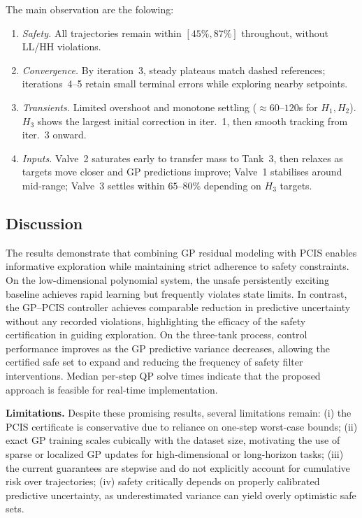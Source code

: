 \documentclass[10pt]{article}
\newcommand{\1}{\mathbbm{1}}
\begin{document}
The main observation are the folowing:
\begin{enumerate}
    \item \textit{Safety.} All trajectories remain within $[45\%,87\%]$ throughout, without LL/HH violations.
    \item \textit{Convergence.} By iteration~3, steady plateaus match dashed references; iterations~4–5 retain small terminal errors while exploring nearby setpoints.
    \item \textit{Transients.} Limited overshoot and monotone settling ($\approx60$–$120$s for $H_1,H_2$). $H_3$ shows the largest initial correction in iter.~1, then smooth tracking from iter.~3 onward.
    \item \textit{Inputs.} Valve~2 saturates early to transfer mass to Tank~3, then relaxes as targets move closer and GP predictions improve; Valve~1 stabilises around mid-range; Valve~3 settles within $65$–$80\%$ depending on $H_3$ targets.
\end{enumerate}

\subsection{Discussion}
\label{sec:discussion}
The results demonstrate that combining GP residual modeling with PCIS enables informative exploration while maintaining strict adherence to safety constraints. On the low-dimensional polynomial system, the unsafe persistently exciting baseline achieves rapid learning but frequently violates state limits. In contrast, the GP--PCIS controller achieves comparable reduction in predictive uncertainty without any recorded violations, highlighting the efficacy of the safety certification in guiding exploration. On the three-tank process, control performance improves as the GP predictive variance decreases, allowing the certified safe set to expand and reducing the frequency of safety filter interventions. Median per-step QP solve times indicate that the proposed approach is feasible for real-time implementation.

\textbf{Limitations.} Despite these promising results, several limitations remain:  
(i) the PCIS certificate is conservative due to reliance on one-step worst-case bounds;  
(ii) exact GP training scales cubically with the dataset size, motivating the use of sparse or localized GP updates for high-dimensional or long-horizon tasks;  
(iii) the current guarantees are stepwise and do not explicitly account for cumulative risk over trajectories;  
(iv) safety critically depends on properly calibrated predictive uncertainty, as underestimated variance can yield overly optimistic safe sets.  
\end{document}
